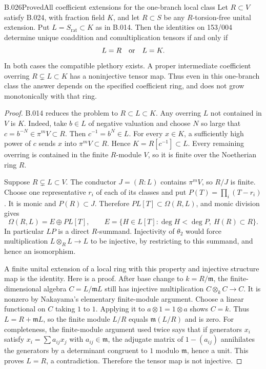 \begin{saresult}{B.026}{Proved}{All coefficient extensions for the one-branch local class}
Let $R\subset V$ satisfy B.024, with fraction field $K$, and let
$R\subset S$ be any $R$-torsion-free unital extension. Put
$L=S_{\mathrm{rat}}\subset K$ as in B.014. Then the identities
on 153/004 determine unique coaddition and comultiplication tensors
if and only if
\[
 L=R\quad\hbox{or}\quad L=K.
\]
In both cases the compatible plethory exists. A proper intermediate
coefficient overring $R\subsetneq L\subset K$ has a noninjective
tensor map. Thus even in this one-branch class the answer depends
on the specified coefficient ring, and does not grow monotonically
with that ring.
\end{saresult}
\begin{proof}
B.014 reduces the problem to $R\subset L\subset K$.
Any overring $L$ not contained in $V$ is $K$. Indeed, take
$b\in L$ of negative valuation and choose $N$ so large that
$c=b^{-N}\in\pi^mV\subset R$. Then $c^{-1}=b^N\in L$.
For every $x\in K$, a sufficiently high power of $c$ sends $x$
into $\pi^mV\subset R$. Hence $K=R[c^{-1}]\subset L$.
Every remaining overring is contained in the finite $R$-module
$V$, so it is finite over the Noetherian ring $R$.

Suppose $R\subsetneq L\subset V$. The conductor
$J=(R:L)$ contains $\pi^mV$, so $R/J$ is finite. Choose one
representative $r_i$ of each of its classes and put
$P(T)=\prod_i(T-r_i)$. It is monic and $P(R)\subset J$.
Therefore $P L[T]\subset\Omega(R,L)$, and monic division gives
\[
 \Omega(R,L)=E\oplus PL[T],\qquad
 E=\{H\in L[T]:\deg H<\deg P,\ H(R)\subset R\}.
\]
In particular $LP$ is a direct $R$-summand. Injectivity of
$\theta_2$ would force multiplication
$L\otimes_RL\to L$ to be injective, by restricting to this
summand, and hence an isomorphism.

A finite unital extension of a local ring with this property and
injective structure map is the identity. Here is a proof. After
base change to $k=R/\mathfrak m$, the finite-dimensional algebra
$C=L/\mathfrak mL$ still has injective multiplication
$C\otimes_kC\to C$. It is nonzero by Nakayama's elementary
finite-module argument. Choose a linear functional on $C$ taking
$1$ to $1$. Applying it to $a\otimes1=1\otimes a$ shows $C=k$.
Thus $L=R+\mathfrak mL$, so the finite module $L/R$ equals
$\mathfrak m(L/R)$ and is zero. For completeness, the finite-module
argument used twice says that if generators $x_i$ satisfy
$x_i=\sum a_{ij}x_j$ with $a_{ij}\in\mathfrak m$, the adjugate
matrix of $1-(a_{ij})$ annihilates the generators by a determinant
congruent to $1$ modulo $\mathfrak m$, hence a unit. This proves
$L=R$, a contradiction. Therefore the tensor map is not injective.


\end{proof}
